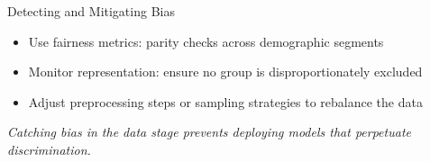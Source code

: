 \documentclass[aspectratio=169]{beamer}
\begin{document}
%
%
%
\begin{frame}{Detecting and Mitigating Bias}
\begin{itemize}
\item Use fairness metrics: parity checks across demographic segments
\item Monitor representation: ensure no group is disproportionately excluded
\item Adjust preprocessing steps or sampling strategies to rebalance the data
\end{itemize}

\vspace{0.8em}
\emph{Catching bias in the data stage prevents deploying models that perpetuate discrimination.}

\end{frame}
\end{document}
